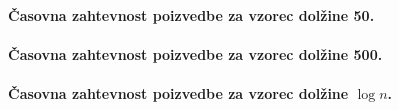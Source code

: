 \paragraph{Časovna zahtevnost poizvedbe za vzorec dolžine 50.}

\paragraph{Časovna zahtevnost poizvedbe za vzorec dolžine 500.}

\paragraph{Časovna zahtevnost poizvedbe za vzorec dolžine $\log{n}$.}



%
%
%
%
